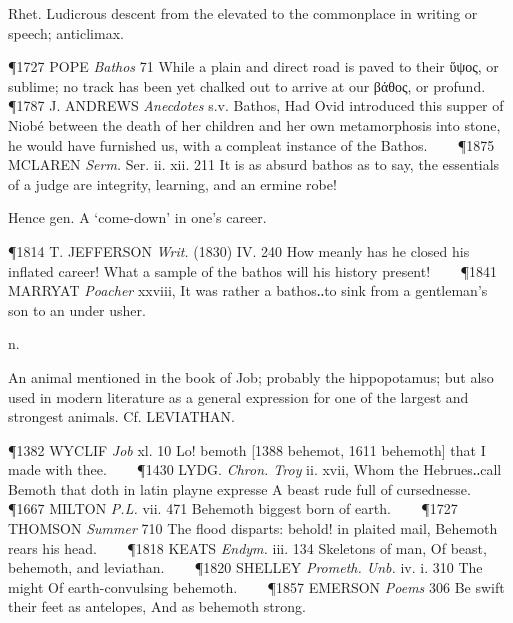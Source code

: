 \begin{description}[wide, labelwidth=!, labelindent=0pt]
\begin{myenumerate}
 Rhet. Ludicrous descent from the elevated to the commonplace in writing or speech; anticlimax.

\P 1727 POPE  \textit{Bathos} 71 While a plain and direct road is paved to their ὕψος, or sublime; no track has been yet chalked out to arrive at our βάθος, or profund.    
\P 1787 J. ANDREWS  \textit{Anecdotes} s.v. Bathos, Had Ovid introduced this supper of Niobé between the death of her children and her own metamorphosis into stone, he would have furnished us, with a compleat instance of the Bathos.    
\P 1875 MCLAREN  \textit{Serm.} Ser. ii. xii. 211 It is as absurd bathos as to say, the essentials of a judge are integrity, learning, and an ermine robe!

 Hence gen. A ‘come-down’ in one's career.

\P 1814 T. JEFFERSON  \textit{Writ.} (1830) IV. 240 How meanly has he closed his inflated career! What a sample of the bathos will his history present!    
\P 1841 MARRYAT  \textit{Poacher} xxviii, It was rather a bathos‥to sink from a gentleman's son to an under usher.
\end{myenumerate}


 n.

\noindent {}

\vspace{-0.3cm}

An animal mentioned in the book of Job; probably the hippopotamus; but also used in modern literature as a general expression for one of the largest and strongest animals. Cf. LEVIATHAN.

\P 1382 WYCLIF  \textit{Job} xl. 10 Lo! bemoth [1388 behemot, 1611 behemoth] that I made with thee.    
\P 1430 LYDG.  \textit{Chron. Troy} ii. xvii, Whom the Hebrues‥call Bemoth that doth in latin playne expresse A beast rude full of cursednesse.    
\P 1667 MILTON  \textit{P.L.} vii. 471 Behemoth biggest born of earth.    
\P 1727 THOMSON  \textit{Summer} 710 The flood disparts: behold! in plaited mail, Behemoth rears his head.    
\P 1818 KEATS  \textit{Endym.} iii. 134 Skeletons of man, Of beast, behemoth, and leviathan.    
\P 1820 SHELLEY  \textit{Prometh. Unb.} iv. i. 310 The might Of earth-convulsing behemoth.    
\P 1857 EMERSON  \textit{Poems} 306 Be swift their feet as antelopes, And as behemoth strong.


\end{description}
